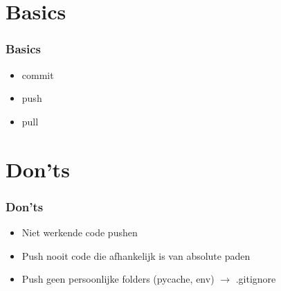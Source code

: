 %	
		
    \section{Basics}
    \begin{frame} 
		\frametitle{Basics}
		\begin{itemize}
			\item commit
			\item push
			\item pull
		\end{itemize}
	\end{frame}
	
	\section{Don'ts}
    \begin{frame} 
		\frametitle{Don'ts}
		\begin{itemize}
			\item Niet werkende code pushen
			\item Push nooit code die afhankelijk is van absolute paden
			\item Push geen persoonlijke folders (pycache, env) $\rightarrow$ .gitignore
		\end{itemize}
	\end{frame}
	
